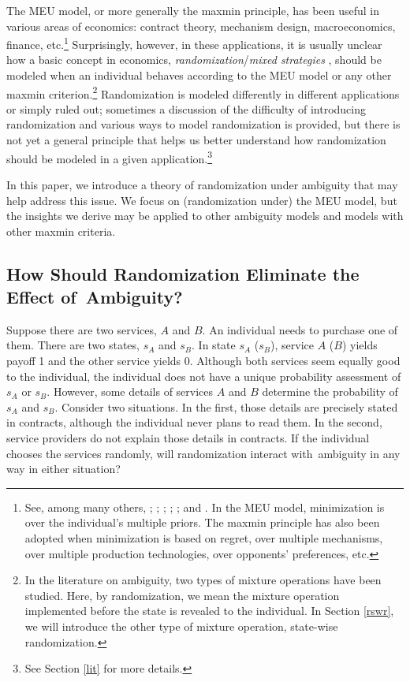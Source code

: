 \documentclass[12pt, notitlepage]{article}
\begin{document}
The MEU model, or more generally the maxmin principle, has been useful in
various areas of economics: contract theory, mechanism design,
macroeconomics, finance, etc.\footnote{\label{other_mm}See, among many
others, \cite{HansenSargent10}; \cite{BergemannSchlag11}; \cite{Antic14}; 
\cite{EasleyOHaraYang14}; \cite{DiTillioKosMessner17}; and \cite%
{CarrascoFarinhaLuzKosEtAl18}. In the MEU model, minimization is over the
individual's multiple priors. The maxmin principle has also been adopted
when minimization is based on regret, over multiple mechanisms, over
multiple production technologies, over opponents' preferences, etc.}
Surprisingly, however, in these applications, it is usually unclear how a
basic concept in economics, \textit{randomization}/\textit{mixed strategies}%
, should be modeled when an individual behaves according to the MEU model or
any other maxmin criterion.\footnote{%
In the literature on ambiguity, two types of mixture operations have been
studied. Here, by randomization, we mean the mixture operation implemented
before the state is revealed to the individual. In Section \ref{rswr}, we
will introduce the other type of mixture operation, state-wise randomization.%
} Randomization is modeled differently in different applications or simply
ruled out; sometimes a discussion of the difficulty of introducing
randomization and various ways to model randomization is provided, but there
is not yet a general principle that helps us better understand how
randomization should be modeled in a given application.\footnote{%
See Section \ref{lit} for more details.}

In this paper, we introduce a theory of randomization under ambiguity that
may help address this issue. We focus on (randomization under) the MEU
model, but the insights we derive may be applied to other ambiguity models
and models with other maxmin criteria.

\subsection{How Should Randomization Eliminate the Effect of\ Ambiguity?}

\label{sec_1.1}Suppose there are two services, $A$ and $B$. An individual
needs to purchase one of them. There are two states, $s_{A}$ and $s_{B}$. In
state $s_{A}$ ($s_{B}$), service $A$ ($B$) yields payoff 1 and the other
service yields 0. Although both services seem equally good to the
individual, the individual does not have a unique probability assessment of $%
s_{A}$ or $s_{B}$. However, some details of services $A$ and $B$ determine
the probability of $s_{A}$ and $s_{B}$. Consider two situations. In the
first, those details are precisely stated in contracts, although the
individual never plans to read them. In the second, service providers do not
explain those details in contracts. If the individual chooses the services
randomly, will randomization interact with\ ambiguity in any way in either
situation?
\end{document}
